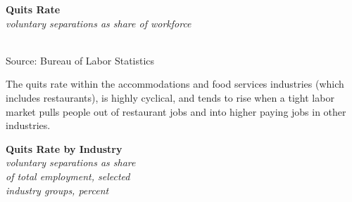 \documentclass{report}
\makeatletter
\newcommand{\tbllink}[1]{\href{https://raw.githubusercontent.com/bdecon/US-chartbook/master/chartbook/data/#1}{\faTable}}
\newcommand*\short[1]{\expandafter\@gobbletwo\number\numexpr#1\relax}
\newcommand{\stdnode}[3]{\node[below, align=left, shift=({#1,#2})]{#3};}
\newcommand{\shdateaxisticks}{
		date coordinates in=x, axis line style={draw=none},
		xmax={2021-02-01},
		max space between ticks=40,	    
		xtick={{1990-01-01}, {1995-01-01}, {2000-01-01}, 
			{2005-01-01}, {2010-01-01}, {2015-01-01}, {2020-01-01}},
		minor xtick={},
		enlarge y limits={0.06}, enlarge x limits={0.01},
		}
\newcommand{\bbar}[2]{extra #1 ticks = {{#2}}, extra #1 tick labels = ,
		extra #1 tick style = {grid=major, grid style={thick, black!25}},}
\newcommand{\stdline}[4]{\addplot[very thick, no markers, color=#1] 
		table [x=#2, y=#3, col sep=comma] {#4};	}
\newcommand{\rebars}{
		\fill[color=black!10] (axis cs:{2007-12-01},\pgfkeysvalueof{/pgfplots/ymin}) rectangle 
			(axis cs:{2009-07-01}, \pgfkeysvalueof{/pgfplots/ymax});
		\fill[color=black!10] (axis cs:{2001-03-01},\pgfkeysvalueof{/pgfplots/ymin}) rectangle 
			(axis cs:{2001-11-01}, \pgfkeysvalueof{/pgfplots/ymax});}
\makeatother
\begin{document}
{{{{{{{{{\begin{minipage}{0.38\textwidth}
\noindent \normalsize \textbf{Quits Rate}\\
\footnotesize{\textit{voluntary separations as share of workforce}}\\ 
\noindent \hspace*{-2mm} \\
\footnotesize{Source: Bureau of Labor Statistics} \hspace{14mm} \tbllink{quits.csv}\\
\end{minipage}
\hspace{9mm}
\begin{minipage}{0.31\textwidth}
\small The quits rate within the accommodations and food services industries (which includes restaurants), is highly cyclical, and tends to rise when a tight labor market pulls people out of restaurant jobs and into higher paying jobs in other industries. 
\end{minipage}

\newpage

\begin{minipage}{0.42\textwidth}
\noindent \normalsize \textbf{Quits Rate by Industry}\\
\footnotesize{\textit{voluntary separations as share }}\\
\footnotesize{\textit{of total employment, selected }}\\
\footnotesize{\textit{industry groups, percent}}\\
\vspace{9.7cm}


\end{minipage}}}}}}}}}}
\end{document}
